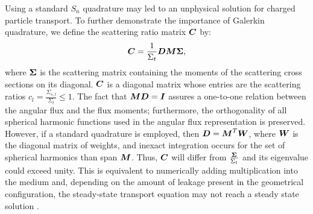 Using a standard $S_n$ quadrature may led to an unphysical solution for
charged particle transport. To further demonstrate the importance of Galerkin
quadrature, we define the scattering ratio matrix $\boldsymbol{C}$ by:
\begin{equation}
\boldsymbol{C} = \frac{1}{\Sigma_t}\boldsymbol{D}\boldsymbol{M}\boldsymbol{\Sigma},
\end{equation}
where $\boldsymbol{\Sigma}$ is the scattering matrix containing the moments of the
scattering cross sections on its diagonal.
$\boldsymbol{C}$ is a diagonal matrix whose entries are the scattering ratios
$c_l=\frac{\Sigma_{s,l}}{\Sigma_t} \leq 1$. The fact that $\boldsymbol{MD}=\boldsymbol{I}$
assures a one-to-one relation between the angular flux and the flux moments;
furthermore, the orthogonality of all spherical harmonic functions used in the
angular flux representation is preserved. However, if a standard quadrature is
employed, then $\boldsymbol{D} = \boldsymbol{M}^T \boldsymbol{W}$, where $\boldsymbol{W}$ is the diagonal
matrix of weights, and inexact integration occurs for the set of spherical
harmonics than span $\boldsymbol{M}$. Thus, $\boldsymbol{C}$ will differ from
$\frac{\boldsymbol{\Sigma}}{\Sigma_t}$ and its eigenvalue could exceed unity. This is
equivalent to numerically adding multiplication into the medium and, depending
on the amount of leakage present in the geometrical configuration, the
steady-state transport equation may not reach a steady state solution
\cite{pautz_fp}.

